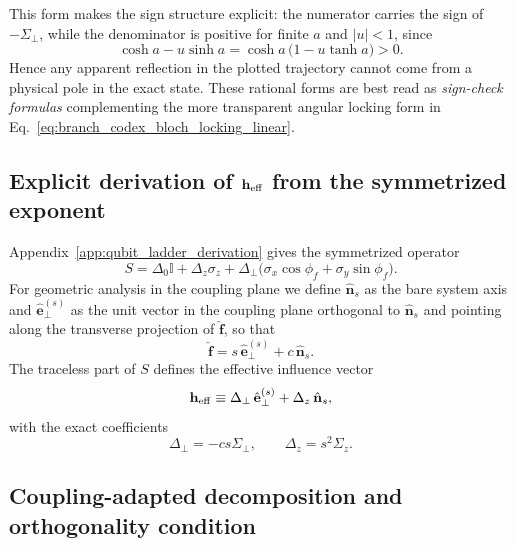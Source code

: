 This form makes the sign structure explicit: the numerator carries the sign of
$-\Sigma_\perp$, while the denominator is positive for finite $a$ and $|u|<1$,
since
\begin{equation}
    \cosh a - u\sinh a
    = \cosh a\,\bigl(1-u\tanh a\bigr) > 0.
    \label{eq:branch_codex_positive_denom}
\end{equation}
Hence any apparent reflection in the plotted trajectory cannot come from a
physical pole in the exact state.  These rational forms are best read as
\emph{sign-check formulas} complementing the more transparent angular locking
form in Eq.~\eqref{eq:branch_codex_bloch_locking_linear}.

\subsection{Explicit derivation of $\mathbf h_{\rm eff}$ from the symmetrized exponent}

Appendix~\ref{app:qubit_ladder_derivation} gives the symmetrized operator
\begin{equation}
    S = \Delta_0 \mathbb{I} + \Delta_z \sigma_z
      + \Delta_\perp\bigl(\sigma_x\cos\phi_f + \sigma_y\sin\phi_f\bigr).
\end{equation}
For geometric analysis in the coupling plane we define $\hat{\mathbf n}_s$ as
the bare system axis and $\hat{\mathbf e}_{\perp}^{(s)}$ as the unit vector in
the coupling plane orthogonal to $\hat{\mathbf n}_s$ and pointing along the
transverse projection of $\hat{\mathbf f}$, so that
\begin{equation}
    \hat{\mathbf f} = s\,\hat{\mathbf e}_{\perp}^{(s)} + c\,\hat{\mathbf n}_s.
\end{equation}
The traceless part of $S$ defines the effective influence vector
\begin{equation}
    \mathbf h_{\rm eff}
    \equiv \Delta_\perp\,\hat{\mathbf e}_{\perp}^{(s)}
         + \Delta_z\,\hat{\mathbf n}_s,
    \label{eq:branch_codex_heff_energy_basis}
\end{equation}
with the exact coefficients
\begin{equation}
    \Delta_\perp = -c s \Sigma_\perp,
    \qquad
    \Delta_z = s^2 \Sigma_z .
    \label{eq:branch_codex_delta_components}
\end{equation}

\subsection{Coupling-adapted decomposition and orthogonality condition}

